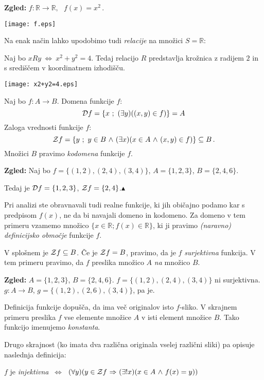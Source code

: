 \documentclass[11pt,paper=b5,footinclude,headinclude]{scrbook} %
\def\inn {{~\wedge~}}
\def\sledi {{~\Rightarrow~}}
\def\cee {{~\Leftrightarrow~}}
\def\zgled{\noindent\textbf{\color{blue} Zgled: }}
\def\kz{{\hfill{\color{blue}$\blacktriangle$}}}%
\begin{document}
\textbf{ Zgled:} $f:\mathbb{R}\to \mathbb{R},~~~f(x) = x^2\,.$
\begin{center}
\texttt{[image: f.eps]}
\end{center}

\medskip

Na enak način lahko upodobimo tudi {\em relacije} na množici  $S =\mathbb{R}$:

Naj bo $xRy \cee x^2+y^2 = 4$.
Tedaj relacijo $R$ predstavlja krožnica z radijem $2$ in s središčem v koordinatnem izhodišču.

\begin{center}
\texttt{[image: x2+y2=4.eps]}
\end{center}

\bigskip
Naj bo $f:A\to B$. Domena funkcije $f$:
$${\cal D}f = \{x~;~(\exists y)((x,y)\in f)\} = A$$
Zaloga vrednosti funkcije $f$:
$${\cal Z}f = \{y~;~y\in B\inn (\exists x)(x\in A\inn (x,y)\in f)\} \subseteq B\,.$$
Množici $B$ pravimo \emph{ kodomena} funkcije $f$.

\medskip
\zgled
Naj bo $f = \{(1,2),(2,4),(3,4)\}$, $A = \{1,2,3\}$, $B = \{2,4,6\}$.

Tedaj je ${\cal D}f = \{1,2,3\}$, ${\cal Z}f = \{2,4\}$.\kz

\bigskip
Pri analizi ste obravnavali tudi realne funkcije, ki jih običajno podamo kar s predpisom $f(x)$, ne da bi navajali domeno in kodomeno.
Za domeno v tem primeru vzamemo množico $\{x\in \mathbb{R}; f(x)\in \mathbb{R}\}$, ki ji
pravimo \emph{ (naravno) definicijsko območje} funkcije $f$.

\bigskip
V splošnem je ${\cal Z}f \subseteq B$. Če je ${\cal Z}f  = B$, pravimo, da je  $f$ {\em surjektivna} funkcija.
V tem primeru pravimo, da $f$ preslika množico $A$ {\em na} množico $B$.

\bigskip
\textbf{ Zgled:} $A = \{1,2,3\}$, $B = \{2,4,6\}$. $f= \{(1,2),(2,4),(3,4)\}$ ni surjektivna. $g:A\to B$, $g = \{(1,2),(2,6),(3,4)\}$, pa je.

\bigskip
Definicija funkcije dopušča, da ima več originalov isto $f$-sliko. V skrajnem primeru preslika $f$ vse elemente množice $A$ v isti element množice $B$. Tako funkcijo imenujemo {\em konstanta}.

Drugo skrajnost (ko imata dva različna originala vselej različni sliki) pa opisuje
naslednja definicija:

$f$ je {\em injektivna} $\cee$ $(\forall y)(y\in {\cal Z}f\sledi (\exists!x)(x\in A \inn f(x) = y))$
\end{document}
